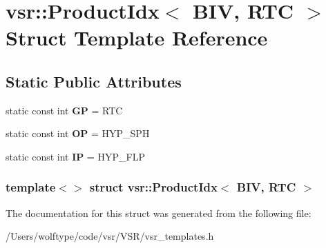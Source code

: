 \hypertarget{structvsr_1_1_product_idx_3_01_b_i_v_00_01_r_t_c_01_4}{\section{vsr\-:\-:Product\-Idx$<$ B\-I\-V, R\-T\-C $>$ Struct Template Reference}
\label{structvsr_1_1_product_idx_3_01_b_i_v_00_01_r_t_c_01_4}
}
\subsection*{Static Public Attributes}
\begin{DoxyCompactItemize}
\item 
\hypertarget{structvsr_1_1_product_idx_3_01_b_i_v_00_01_r_t_c_01_4_a775df180e7082eaeb4c8bc4bf906eae0}{static const int {\bfseries G\-P} = R\-T\-C}\label{structvsr_1_1_product_idx_3_01_b_i_v_00_01_r_t_c_01_4_a775df180e7082eaeb4c8bc4bf906eae0}

\item 
\hypertarget{structvsr_1_1_product_idx_3_01_b_i_v_00_01_r_t_c_01_4_a62e3df0211bcfbb5b15281f315d9f951}{static const int {\bfseries O\-P} = H\-Y\-P\-\_\-\-S\-P\-H}\label{structvsr_1_1_product_idx_3_01_b_i_v_00_01_r_t_c_01_4_a62e3df0211bcfbb5b15281f315d9f951}

\item 
\hypertarget{structvsr_1_1_product_idx_3_01_b_i_v_00_01_r_t_c_01_4_a725aae4523392426c959391efc1dabc0}{static const int {\bfseries I\-P} = H\-Y\-P\-\_\-\-F\-L\-P}\label{structvsr_1_1_product_idx_3_01_b_i_v_00_01_r_t_c_01_4_a725aae4523392426c959391efc1dabc0}

\end{DoxyCompactItemize}
\subsubsection*{template$<$$>$ struct vsr\-::\-Product\-Idx$<$ B\-I\-V, R\-T\-C $>$}



The documentation for this struct was generated from the following file\-:\begin{DoxyCompactItemize}
\item 
/\-Users/wolftype/code/vsr/\-V\-S\-R/vsr\-\_\-templates.\-h\end{DoxyCompactItemize}
